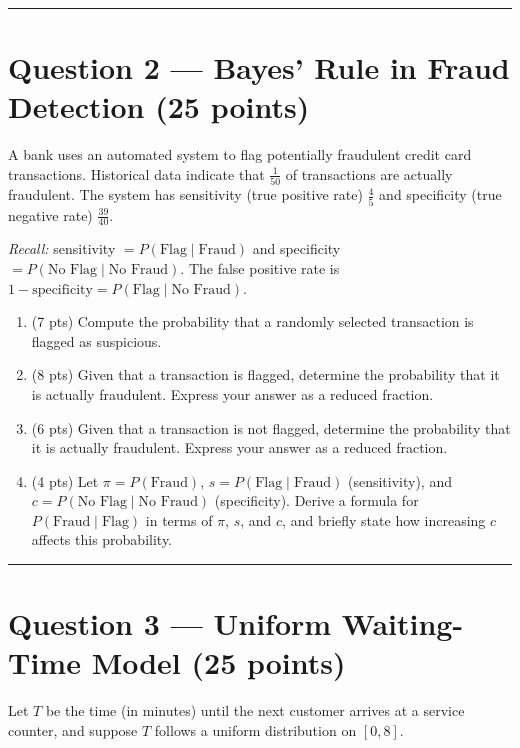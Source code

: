 \documentclass[11pt]{article}
\begin{document}
\vspace{0.75em}
\hrule
\vspace{0.75em}

\section*{Question 2 — Bayes' Rule in Fraud Detection (25 points)}

A bank uses an automated system to flag potentially fraudulent credit card transactions. Historical data indicate that $\tfrac{1}{50}$ of transactions are actually fraudulent. The system has sensitivity (true positive rate) $\tfrac{4}{5}$ and specificity (true negative rate) $\tfrac{39}{40}$.

\medskip
\noindent\textit{Recall:} sensitivity $= P(\text{Flag} \mid \text{Fraud})$ and specificity $= P(\text{No Flag} \mid \text{No Fraud})$. The false positive rate is $1-\text{specificity} = P(\text{Flag} \mid \text{No Fraud})$.

\begin{enumerate}
  \item (7 pts) Compute the probability that a randomly selected transaction is flagged as suspicious.
  \item (8 pts) Given that a transaction is flagged, determine the probability that it is actually fraudulent. Express your answer as a reduced fraction.
  \item (6 pts) Given that a transaction is not flagged, determine the probability that it is actually fraudulent. Express your answer as a reduced fraction.
  \item (4 pts) Let $\pi = P(\text{Fraud})$, $s = P(\text{Flag} \mid \text{Fraud})$ (sensitivity), and $c = P(\text{No Flag} \mid \text{No Fraud})$ (specificity). Derive a formula for $P(\text{Fraud} \mid \text{Flag})$ in terms of $\pi$, $s$, and $c$, and briefly state how increasing $c$ affects this probability.
\end{enumerate}

\vspace{0.75em}
\hrule
\vspace{0.75em}

\section*{Question 3 — Uniform Waiting-Time Model (25 points)}

Let $T$ be the time (in minutes) until the next customer arrives at a service counter, and suppose $T$ follows a uniform distribution on $[0,8]$.
\end{document}
